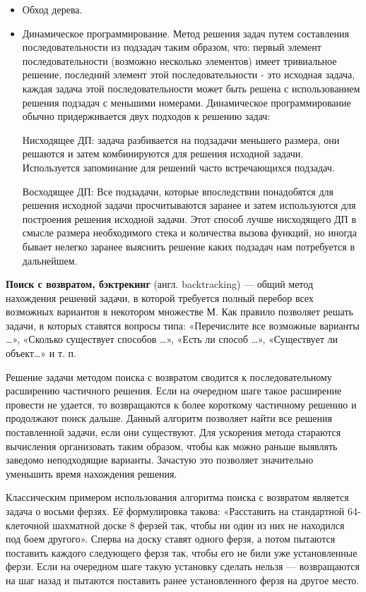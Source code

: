\documentclass[12pt, a4paper]{article}
\begin{document}
\begin{itemize}
    \item Обход дерева.
    \item Динамическое программирование. Метод решения задач путем составления последовательности из подзадач таким образом, что: первый элемент последовательности (возможно несколько элементов) имеет тривиальное решение, последний элемент этой последовательности - это исходная задача, каждая задача этой последовательности может быть решена с использованием решения подзадач с меньшими номерами. Динамическое программирование обычно придерживается двух подходов к решению задач:
    
    Нисходящее ДП: задача разбивается на подзадачи меньшего размера, они решаются и затем комбинируются для решения исходной задачи. Используется запоминание для решений часто встречающихся подзадач.
    
    Восходящее ДП: Все подзадачи, которые впоследствии понадобятся для решения исходной задачи просчитываются заранее и затем используются для построения решения исходной задачи. Этот способ лучше нисходящего ДП в смысле размера необходимого стека и количества вызова функций, но иногда бывает нелегко заранее выяснить решение каких подзадач нам потребуется в дальнейшем.
\end{itemize}

\textbf{Поиск с возвратом, бэктрекинг} (англ. backtracking) — общий метод нахождения решений задачи, в которой требуется полный перебор всех возможных вариантов в некотором множестве М. Как правило позволяет решать задачи, в которых ставятся вопросы типа: «Перечислите все возможные варианты …», «Сколько существует способов …», «Есть ли способ …», «Существует ли объект…» и т. п.

Решение задачи методом поиска с возвратом сводится к последовательному расширению частичного решения. Если на очередном шаге такое расширение провести не удается, то возвращаются к более короткому частичному решению и продолжают поиск дальше. Данный алгоритм позволяет найти все решения поставленной задачи, если они существуют. Для ускорения метода стараются вычисления организовать таким образом, чтобы как можно раньше выявлять заведомо неподходящие варианты. Зачастую это позволяет значительно уменьшить время нахождения решения.

Классическим примером использования алгоритма поиска с возвратом является задача о восьми ферзях. Её формулировка такова: «Расставить на стандартной 64-клеточной шахматной доске 8 ферзей так, чтобы ни один из них не находился под боем другого». Сперва на доску ставят одного ферзя, а потом пытаются поставить каждого следующего ферзя так, чтобы его не били уже установленные ферзи. Если на очередном шаге такую установку сделать нельзя — возвращаются на шаг назад и пытаются поставить ранее установленного ферзя на другое место.
\end{document}
